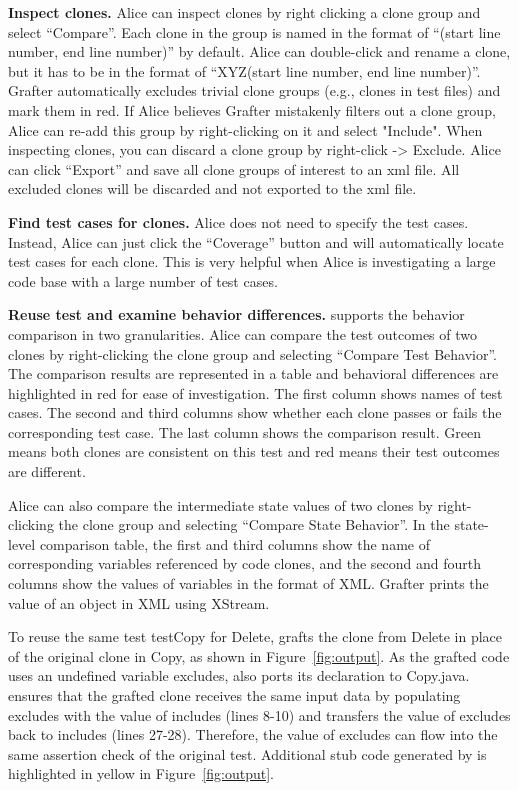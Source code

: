 {\bf Inspect clones.} Alice can inspect clones by right clicking a clone group and select ``Compare''. Each clone in the group is named in the format of ``(start line number, end line number)'' by default. Alice can double-click and rename a clone, but it has to be in the format of ``XYZ(start line number, end line number)''. Grafter automatically excludes trivial clone groups (e.g., clones in test files) and mark them in red. If Alice believes Grafter mistakenly filters out a clone group, Alice can re-add this group by right-clicking on it and select "Include". When inspecting clones, you can discard a clone group by right-click -> Exclude. Alice can click ``Export'' and save all clone groups of interest to an xml file. All excluded clones will be discarded and not exported to the xml file.

{\bf Find test cases for clones.} Alice does not need to specify the test cases. Instead, Alice can just click the ``Coverage'' button and {\grafter} will automatically locate test cases for each clone. This is very helpful when Alice is investigating a large code base with a large number of test cases.

{\bf Reuse test and examine behavior differences.} {\grafter} supports the behavior comparison in two granularities. Alice can compare the test outcomes of two clones by right-clicking the clone group and selecting ``Compare Test Behavior''. The comparison results are represented in a table and behavioral differences are highlighted in red for ease of investigation. The first column shows names of test cases. The second and third columns show whether each clone passes or fails the corresponding test case. The last column shows the comparison result. Green means both clones are consistent on this test and red means their test outcomes are different.

Alice can also compare the intermediate state values of two clones by right-clicking the clone group and selecting ``Compare State Behavior''. In the state-level comparison table, the first and third columns show the name of corresponding variables referenced by code clones, and the second and fourth columns show the values of variables in the format of XML. Grafter prints the value of an object in XML using XStream.

To reuse the same test {\ttt testCopy} for {\ttt Delete}, {\grafter} grafts the clone from {\ttt Delete} in place of the original clone in {\ttt Copy}, as shown in Figure~\ref{fig:output}. As the grafted code uses an undefined variable {\ttt excludes}, {\grafter} also ports its declaration to {\ttt Copy.java}. {\grafter} ensures that the grafted clone receives the same input data by populating {\ttt excludes} with the value of {\ttt includes} (lines 8-10) and transfers the value of {\ttt excludes} back to {\ttt includes} (lines 27-28). Therefore, the value of {\ttt excludes} can flow into the same assertion check of the original test. Additional stub code generated by {\grafter} is highlighted in yellow in Figure~\ref{fig:output}.

